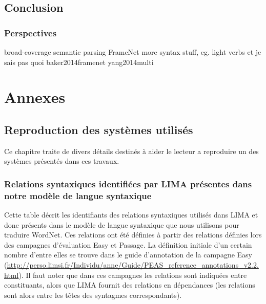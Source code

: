 \documentclass[oneside,parskip,draft]{scrbook}
\begin{document}






\chapter*{Conclusion}
\label{ch:conc}

\section{Perspectives}

broad-coverage semantic parsing
FrameNet more syntax stuff, eg. light verbs et je sais pas quoi baker2014framenet yang2014multi

\backmatter




\part{Annexes}

\chapter{Reproduction des systèmes utilisés}

Ce chapitre traite de divers détails destinés à aider le lecteur a reproduire
un des systèmes présentés dans ces travaux.

\section{Relations syntaxiques identifiées par LIMA présentes dans notre modèle
de langue syntaxique}

Cette table décrit les identifiants des relations syntaxiques utilisés dans
LIMA et donc présents dans le modèle de langue syntaxique que nous utilisons
pour traduire WordNet. Ces relations ont été définies à partir des relations
définies lors des campagnes d'évaluation Easy et Passage. La définition
initiale d'un certain nombre d'entre elles se trouve dans le guide d'annotation
de la campagne Easy
(\url{http://perso.limsi.fr/Individu/anne/Guide/PEAS_reference_annotations_v2.2.html}).
Il faut noter que dans ces campagnes les relations sont indiquées entre
constituants, alors que LIMA fournit des relations en dépendances (les
relations sont alors entre les têtes des syntagmes correspondants).
\end{document}
